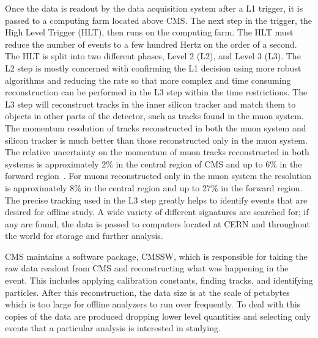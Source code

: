 Once the data is readout by the data acquisition system after a L1 trigger, it is passed to a computing farm located above CMS.
The next step in the trigger, the High Level Trigger (HLT), then runs on the computing farm.
The HLT must reduce the number of events to a few hundred Hertz on the order of a second. 
The HLT is split into two different
phases, Level 2 (L2), and Level 3 (L3). The L2 step is mostly concerned with confirming the L1 decision using more robust algorithms
and reducing the rate so that more complex and time consuming reconstruction can be performed in the L3 step within the time restrictions.
The L3 step will reconstruct tracks in the inner silicon tracker and match them
to objects in other parts of the detector, such as tracks found in the muon system. The momentum resolution of tracks reconstructed in both the muon system and silicon tracker
is much better than those reconstructed only in the muon system. The relative uncertainty on the momentum of muon tracks reconstructed in both systems is approximately
2\% in the central region of CMS and up to 6\% in the forward region~\cite{2012JInst...7P0002T}. For muons reconstructed only in the muon system the 
resolution is approximately 8\%
in the central region and up to 27\% in the forward region. 
The precise tracking used in the L3 step greatly helps to identify events that are desired for offline study.
A wide variety of different signatures are searched for; if any are found, the data is passed to computers located at CERN
and throughout the world for storage and further analysis.

CMS maintains a software package, CMSSW, which is responsible for taking the raw data readout from CMS and reconstructing what was happening in the event.
This includes applying calibration constants, finding tracks, and identifying particles.
After this reconstruction, the data size is at the scale of petabytes which is too large for offline analyzers to run over frequently. 
To deal with this copies of the data are produced dropping lower level quantities and selecting only events that a particular analysis is interested in studying.

